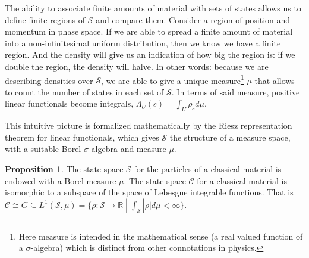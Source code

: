 \documentclass[smallextended]{svjour3}
\numberwithin{equation}{section}
\theoremstyle{definition}
\newtheorem{prop}[equation]{Proposition}
\begin{document}
The ability to associate finite amounts of material with sets of states allows us to define finite regions of $\mathcal{S}$ and compare them. Consider a region of position and momentum in phase space. If we are able to spread a finite amount of material into a non-infinitesimal uniform distribution, then we know we have a finite region. And the density will give us an indication of how big the region is: if we double the region, the density will halve. In other words: because we are describing densities over $\mathcal{S}$, we are able to give a unique measure\footnote{Here measure is intended in the mathematical sense (a real valued function of a $\sigma$-algebra) which is distinct from other connotations in physics.} $\mu$ that allows to count the number of states in each set of $\mathcal{S}$. In terms of said measure, positive linear functionals become integrals, $\Lambda_U (\mathcal{c}) = \int_U \rho_{\mathcal{c}} d \mu$.

This intuitive picture is formalized mathematically by the Riesz representation theorem for linear functionals, which gives $\mathcal{S}$ the structure of a measure space, with a suitable Borel $\sigma$-algebra and measure $\mu$.

\begin{prop}\label{prop:integration}
	The state space $\mathcal{S}$ for the particles of a classical material is endowed with a Borel measure $\mu$. The state space $\mathcal{C}$ for a classical material is isomorphic to a subspace of the space of Lebesgue integrable functions. That is $\mathcal{C} \cong G \subseteq L^1(\mathcal{S}, \mu) = \{ \rho : \mathcal{S} \rightarrow \mathbb{R} \; | \; \int_{\mathcal{S}} |\rho| d\mu < \infty \}$.
\end{prop}
\end{document}
